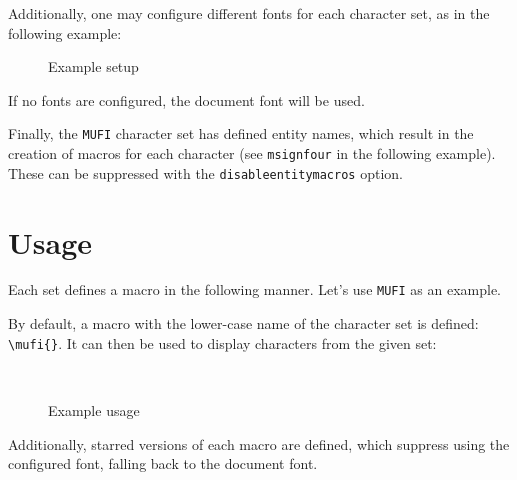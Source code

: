 \documentclass{article}
\begin{document}
\clearpage
Additionally, one may configure different fonts for each character set, as in the following example:

\begin{figure}[H]
\centering
\begin{verbatimtab}
\usepackage[
	MUFI,
	TITUS,
	fonts={
		MUFI=\mufifont,
		TITUS=\titusfont,
	},
]{unicode-alphabets}
\end{verbatimtab}
\caption{Example setup}
\end{figure}

If no fonts are configured, the document font will be used.

Finally, the \verb|MUFI| character set has defined entity names, which result in the creation of macros for each character (see \verb|msignfour| in the following example). These can be suppressed with the \verb|disableentitymacros| option.

\section{Usage}

Each set defines a macro in the following manner. Let's use \verb|MUFI| as an example.

By default, a macro with the lower-case name of the character set is defined: \verb|\mufi{}|. It can then be used to display characters from the given set:

\begin{figure}[H]
\centering
\begin{LTXexample}[varwidth=true]
\\
\msignflour{}
\end{LTXexample}
\caption{Example usage}
\end{figure}

Additionally, starred versions of each macro are defined, which suppress using the configured font, falling back to the document font.

\nocite{*}
\printbibliography
\end{document}
